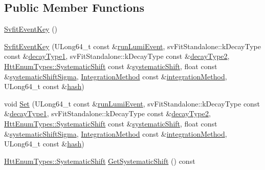 \subsection*{Public Member Functions}
\begin{DoxyCompactItemize}
\item 
\hyperlink{classSvfitEventKey_aff668a7473d61de199fe0ceae2a5df3d}{SvfitEventKey} ()
\item 
\hyperlink{classSvfitEventKey_a76c6b1b4c6af1e59a457958aa3528adf}{SvfitEventKey} (ULong64\_\-t const \&\hyperlink{classSvfitEventKey_afaa8e9d1f49d1717f6498c17a5b6a37a}{runLumiEvent}, svFitStandalone::kDecayType const \&\hyperlink{classSvfitEventKey_a6d4378d317fc0e19a7ce7428c4524343}{decayType1}, svFitStandalone::kDecayType const \&\hyperlink{classSvfitEventKey_a2a985c09ffce1e4e79cfa375c29f6ee0}{decayType2}, \hyperlink{classHttEnumTypes_a09f53466ade8cb436d340aedf88ab0c2}{HttEnumTypes::SystematicShift} const \&\hyperlink{classSvfitEventKey_aadc4624e556a70b6c095ac5373f8bbc8}{systematicShift}, float const \&\hyperlink{classSvfitEventKey_a1e9c9f821950ae0d027d21a8ebd67f46}{systematicShiftSigma}, \hyperlink{classSvfitEventKey_a88a764b33d83be8b5ac538a980de7b03}{IntegrationMethod} const \&\hyperlink{classSvfitEventKey_a8e070522e0476b25b155fb94d4a53e56}{integrationMethod}, ULong64\_\-t const \&\hyperlink{classSvfitEventKey_a4a66e2828f6714fb510373c0df2fd3b6}{hash})
\item 
void \hyperlink{classSvfitEventKey_a69653824044f22206ef446001e2a8752}{Set} (ULong64\_\-t const \&\hyperlink{classSvfitEventKey_afaa8e9d1f49d1717f6498c17a5b6a37a}{runLumiEvent}, svFitStandalone::kDecayType const \&\hyperlink{classSvfitEventKey_a6d4378d317fc0e19a7ce7428c4524343}{decayType1}, svFitStandalone::kDecayType const \&\hyperlink{classSvfitEventKey_a2a985c09ffce1e4e79cfa375c29f6ee0}{decayType2}, \hyperlink{classHttEnumTypes_a09f53466ade8cb436d340aedf88ab0c2}{HttEnumTypes::SystematicShift} const \&\hyperlink{classSvfitEventKey_aadc4624e556a70b6c095ac5373f8bbc8}{systematicShift}, float const \&\hyperlink{classSvfitEventKey_a1e9c9f821950ae0d027d21a8ebd67f46}{systematicShiftSigma}, \hyperlink{classSvfitEventKey_a88a764b33d83be8b5ac538a980de7b03}{IntegrationMethod} const \&\hyperlink{classSvfitEventKey_a8e070522e0476b25b155fb94d4a53e56}{integrationMethod}, ULong64\_\-t const \&\hyperlink{classSvfitEventKey_a4a66e2828f6714fb510373c0df2fd3b6}{hash})
\item 
\hyperlink{classHttEnumTypes_a09f53466ade8cb436d340aedf88ab0c2}{HttEnumTypes::SystematicShift} \hyperlink{classSvfitEventKey_ab524322fe4600f72cc28a83fa5ce31b1}{GetSystematicShift} () const 

\end{DoxyCompactItemize}
